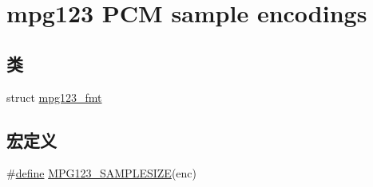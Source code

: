 \hypertarget{group__mpg123__enc}{}\section{mpg123 P\+CM sample encodings}
\label{group__mpg123__enc}
\subsection*{类}
\begin{DoxyCompactItemize}
\item 
struct \hyperlink{structmpg123__fmt}{mpg123\+\_\+fmt}
\end{DoxyCompactItemize}
\subsection*{宏定义}
\begin{DoxyCompactItemize}
\item 
\#\hyperlink{structdefine}{define} \hyperlink{group__mpg123__enc_gafa4071cca43ad223f5f2aea092b1b045}{M\+P\+G123\+\_\+\+S\+A\+M\+P\+L\+E\+S\+I\+ZE}(enc)
\end{DoxyCompactItemize}
